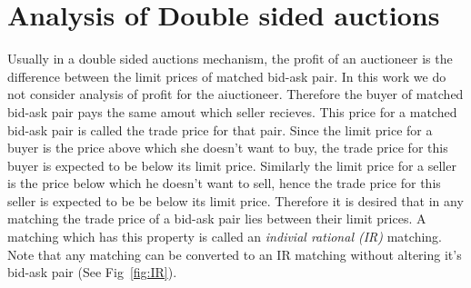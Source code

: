 \documentclass[a4paper,UKenglish,cleveref, autoref]{lipics-v2019}
\begin{document}
\begin{lemma}
\end{lemma}

\begin{lemma}
\end{lemma}

\section{Analysis of Double sided auctions}\label{sec:analysis}
Usually in a double sided auctions mechanism, the profit of an auctioneer is the difference between the limit prices of matched bid-ask pair. In this work we do not consider analysis of profit for the aiuctioneer. Therefore the buyer of matched bid-ask pair pays the same amout which seller recieves. This price for a matched  bid-ask pair is called the trade price for that pair. Since the limit price for a buyer is the price above which she doesn't want to buy, the trade price for this buyer is expected to be below its limit price. Similarly the limit price for a seller is the price below which he doesn't want to sell, hence the trade price for this seller is expected to be be below its limit price. Therefore it is desired that in any matching the trade price of a bid-ask pair lies between their limit prices. A matching which has this property is called an \emph{indivial rational (IR)} matching. Note that any matching can be converted to an IR matching without altering it's bid-ask pair (See Fig~\ref{fig:IR}).
\end{document}
